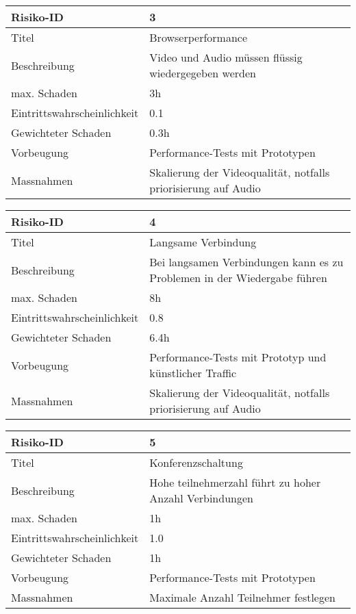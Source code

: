 	
\noindent
\begin{tabular}{|p{} | p{} |}
	\hline	
	Risiko-ID & 3 \\
	\hline
	Titel & Browserperformance \\
	Beschreibung & Video und Audio müssen flüssig wiedergegeben werden\\
	max. Schaden	& 3h \\
	Eintrittswahrscheinlichkeit & 0.1 \\
	Gewichteter Schaden	& 0.3h \\
	Vorbeugung	& Performance-Tests mit Prototypen \\
	Massnahmen	& Skalierung der Videoqualität, notfalls priorisierung auf Audio \\
	\hline
\end{tabular}
\hspace{0.5cm}
\newline
	
	
\noindent
\begin{tabular}{|p{} | p{} |}
	\hline	
	Risiko-ID & 4 \\
	\hline
	Titel & Langsame Verbindung \\
	Beschreibung & Bei langsamen Verbindungen kann es zu Problemen in der Wiedergabe führen \\
	max. Schaden	& 8h \\
	Eintrittswahrscheinlichkeit & 0.8 \\
	Gewichteter Schaden	& 6.4h \\
	Vorbeugung	& Performance-Tests mit Prototyp und künstlicher Traffic \\
	Massnahmen	& Skalierung der Videoqualität, notfalls priorisierung auf Audio \\
	\hline
\end{tabular}
\hspace{0.5cm}
\newline
	
	
\noindent
\begin{tabular}{|p{} | p{} |}
	\hline	
	Risiko-ID & 5 \\
	\hline
	Titel & Konferenzschaltung \\
	Beschreibung & Hohe teilnehmerzahl führt zu hoher Anzahl Verbindungen \\
	max. Schaden	& 1h \\
	Eintrittswahrscheinlichkeit & 1.0 \\
	Gewichteter Schaden	& 1h \\
	Vorbeugung	& Performance-Tests mit Prototypen \\
	Massnahmen	& Maximale Anzahl Teilnehmer festlegen \\
	\hline
\end{tabular}
\hspace{0.5cm}
\newline

